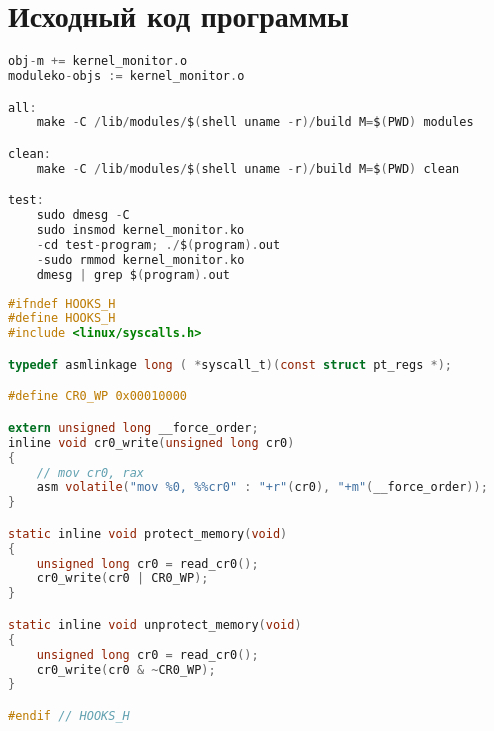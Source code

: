 \chapter{Исходный код программы}
\label{chapter:appendix:1}

\begin{lstlisting}[language=C, label=lst:makefile, caption=Makefile для сбоки загружаемого модуля ядра.]
obj-m += kernel_monitor.o
moduleko-objs := kernel_monitor.o

all:
    make -C /lib/modules/$(shell uname -r)/build M=$(PWD) modules

clean:
    make -C /lib/modules/$(shell uname -r)/build M=$(PWD) clean

test:
	sudo dmesg -C
	sudo insmod kernel_monitor.ko
	-cd test-program; ./$(program).out
	-sudo rmmod kernel_monitor.ko
	dmesg | grep $(program).out
\end{lstlisting}

\begin{lstlisting}[language=C, label=lst:syscall_hooks_h, caption=syscall\_hooks.h.]
#ifndef HOOKS_H
#define HOOKS_H
#include <linux/syscalls.h>

typedef asmlinkage long ( *syscall_t)(const struct pt_regs *);

#define CR0_WP 0x00010000

extern unsigned long __force_order;
inline void cr0_write(unsigned long cr0)
{
    // mov cr0, rax
    asm volatile("mov %0, %%cr0" : "+r"(cr0), "+m"(__force_order));
}

static inline void protect_memory(void)
{
    unsigned long cr0 = read_cr0();
    cr0_write(cr0 | CR0_WP);
}

static inline void unprotect_memory(void)
{
    unsigned long cr0 = read_cr0();
    cr0_write(cr0 & ~CR0_WP);
}

#endif // HOOKS_H
\end{lstlisting}


